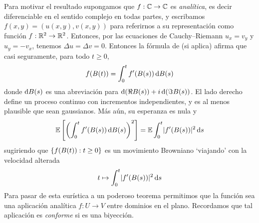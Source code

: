 Para motivar el resultado supongamos que \(f : \mathbb{C} \rightarrow \mathbb{C}\) es \emph{analítica}, es decir diferenciable en el sentido complejo en todas partes, y escribamos \(f(x, y) = (u(x, y), v(x, y))\) para referirnos a su representación como función \(f : \mathbb{R}^2 \rightarrow \mathbb{R}^2\).
Entonces, por las ecuaciones de Cauchy--Riemann \(u_x = v_y\) y \(u_y = - v_x\), tenemos \(\Delta u = \Delta v = 0\).
Entonces la fórmula de \ito{} (si aplica) afirma que casi seguramente, para todo \(t \geq 0\),
\begin{align}
  f(B(t))
  =
  \int_0^t f'(B(s)) \mathop{}\!\mathrm{d} B(s)
\end{align}
donde \(\mathop{}\!\mathrm{d} B(s)\) es una abreviación para \(\mathop{}\!\mathrm{d} (\Re B(s)) + i \mathop{}\!\mathrm{d} (\Im B(s))\).
El lado derecho define un proceso continuo con incrementos independientes, y es al menos plausible que sean gaussianos.
Más aún, su esperanza es nula y
\begin{align}
  \operatorname{\mathbb{E}} \left[ \left( \int_0^t f'(B(s)) \mathop{}\!\mathrm{d} B(s) \right)^2 \right]
  =
  \operatorname{\mathbb{E}} \int_0^t \lvert f'(B(s))\rvert^2 \mathop{}\!\mathrm{d} s
\end{align}
sugiriendo que \(\{f(B(t)) : t \geq 0\}\) es un movimiento Browniano `viajando' con la velocidad alterada
\begin{align}
  t
  \mapsto
  \int_0^t \lvert f'(B(s))\rvert^2 \mathop{}\!\mathrm{d} s
\end{align}
Para pasar de esta eurística a un poderoso teorema permitimos que la función sea una aplicación analítica \(f : U \rightarrow V\) entre dominios en el plano.
Recordamos que tal aplicación es \emph{conforme} si es una biyección.

